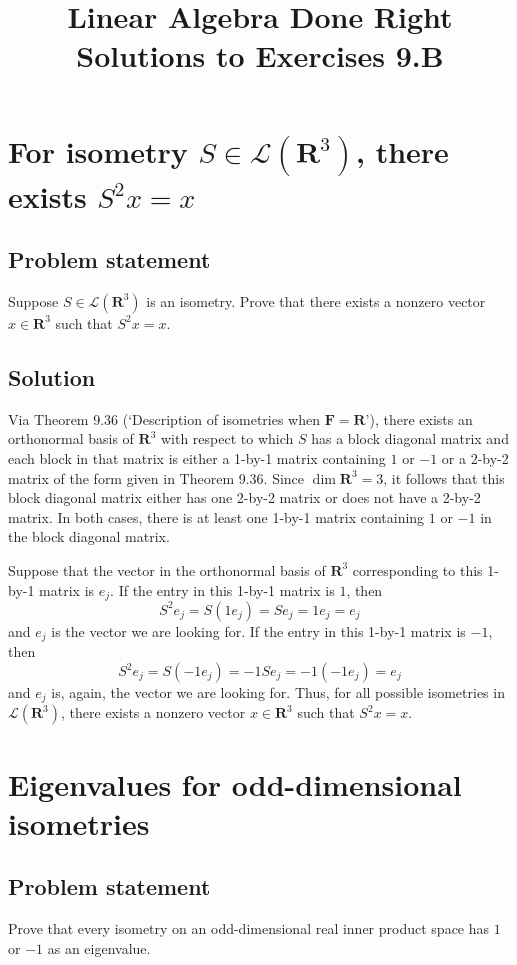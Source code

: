 \documentclass{article}
\title{Linear Algebra Done Right\\Solutions to Exercises 9.B}
\author{}
\date{}
\begin{document}
\maketitle

\section{For isometry $S\in\mathcal{L}(\mathbf{R}^3)$, there exists $S^2x=x$}
\subsection*{Problem statement}
Suppose $S\in\mathcal{L}(\mathbf{R}^3)$ is an isometry. 
Prove that there exists a nonzero vector $x\in\mathbf{R}^3$ such that $S^2x=x$.

\subsection*{Solution}
Via Theorem 9.36 (`Description of isometries when $\mathbf{F}=\mathbf{R}$'), there exists an orthonormal basis of $\mathbf{R}^3$ with respect to which $S$ has a block diagonal matrix and each block in that matrix is either a 1-by-1 matrix containing $1$ or $-1$ or a 2-by-2 matrix of the form given in Theorem 9.36. 
Since $\operatorname{dim}\mathbf{R}^3=3$, it follows that this block diagonal matrix either has one 2-by-2 matrix or does not have a 2-by-2 matrix. 
In both cases, there is at least one 1-by-1 matrix containing $1$ or $-1$ in the block diagonal matrix. 

Suppose that the vector in the orthonormal basis of $\mathbf{R}^3$ corresponding to this 1-by-1 matrix is $e_j$. 
If the entry in this 1-by-1 matrix is $1$, then 
\[S^2e_j=S(1e_j)=Se_j=1e_j=e_j\]
and $e_j$ is the vector we are looking for. 
If the entry in this 1-by-1 matrix is $-1$, then
\[S^2e_j=S(-1e_j)=-1Se_j=-1(-1e_j)=e_j\]
and $e_j$ is, again, the vector we are looking for. 
Thus, for all possible isometries in $\mathcal{L}(\mathbf{R}^3)$, there exists a nonzero vector $x\in\mathbf{R}^3$ such that $S^2x=x$.

\clearpage

\section{Eigenvalues for odd-dimensional isometries}
\subsection*{Problem statement}
Prove that every isometry on an odd-dimensional real inner product space has $1$ or $-1$ as an eigenvalue.
\end{document}
